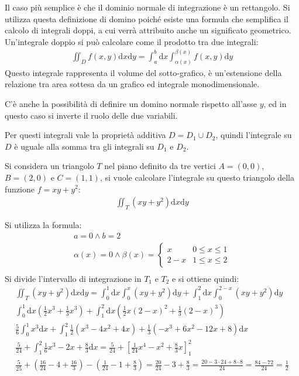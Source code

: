 \documentclass{article}
\newcommand{\df}{\mathrm{d}}
\numberwithin{equation}{subsection}
\begin{document}
Il caso più semplice è che il dominio normale di integrazione è un rettangolo. Si utilizza questa definizione di domino poiché esiste una formula che semplifica il calcolo di integrali doppi, a cui verrà attribuito anche un significato geometrico. 
Un'integrale doppio si può calcolare come il prodotto tra due integrali:
\begin{gather*}
    \displaystyle\iint_D f(x,y)\df x \df y=\int_a^b\df x\int_{\alpha(x)}^{\beta(x)}f(x,y)\df y
\end{gather*}
Questo integrale rappresenta il volume del sotto-grafico, è un'estensione della relazione tra area sottesa da un grafico ed integrale monodimensionale. 

C'è anche la possibilità di definire un domino normale rispetto all'asse $y$, ed in questo caso si inverte il ruolo delle due variabili. 

Per questi integrali vale la proprietà additiva $D=D_1\cup D_2$, quindi l'integrale su $D$ è uguale alla somma tra gli integrali su $D_1$ e $D_2$. 

Si considera un triangolo $T$ nel piano definito da tre vertici $A=(0,0)$, $B=(2,0)$ e $C=(1,1)$, si vuole calcolare l'integrale su questo triangolo della funzione $f=xy+y^2$:
\begin{gather*}
    \iint_T(xy+y^2)\df x\df y
\end{gather*}

Si utilizza la formula:
\begin{gather*}
    a=0\land b=2\\
    \alpha(x)=0\land
    \beta(x)=\begin{cases}
        x&0\leq x\leq 1\\
        2-x &1\leq x\leq 2
    \end{cases}\\
\end{gather*}
Si divide l'intervallo di integrazione in $T_1$ e $T_2$ e si ottiene quindi:
\begin{gather*}
    \iint_T(xy+y^2)\df x\df y=
    \int_0^1\df x\int_{0}^{x}(xy+y^2)\df y+
    \int_1^2\df x\int_{0}^{2-x}(xy+y^2)\df y\\
    \int_0^1\df x\left(\frac{1}{2}x^3+\frac{1}{3}x^3\right)+
    \int_1^2\df x\left(\frac{1}{2}x(2-x)^2+\frac{1}{3}(2-x)^3\right)\\
    \displaystyle\frac{5}{6}\int_0^1x^3\df x+\int_1^2\frac{1}{2}\left(x^3-4x^2+4x\right)+\frac{1}{3}\left(-x^3+6x^2-12x+8\right)\df x\\
    \frac{5}{24}+\int_1^2\frac{1}{6}x^3-2x+\frac{8}{3}\df x=\frac{5}{24}+\left[\frac{1}{24}x^4-x^2+\frac{8}{3}x\right]_1^2\\
    \frac{5}{25}+\left(\frac{16}{24}-4+\frac{16}{3}\right)-\left(\frac{1}{24}-1+\frac{8}{3}\right)=\frac{20}{24}-3+\frac{8}{3}=\frac{20-3\cdot24+8\cdot8}{24}=\frac{84-72}{24}=\frac{1}{2}
\end{gather*}
\end{document}
